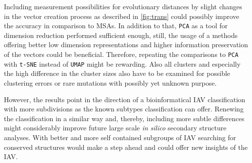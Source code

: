 \vspace{1em}

Including measurement possibilities for evolutionary distances by slight changes in the vector creation process as described in \autoref{fig:trans} could possibly improve the accuracy in comparison to \glspl{MSA}. %
In addition to that, \texttt{PCA} as a tool for dimension reduction performed sufficient enough, still, the usage of a methods offering better low dimension representations and higher information preservation of the vectors could be beneficial. Therefore, repeating the comparisons to \texttt{PCA} with \texttt{t-SNE} instead of \texttt{UMAP} might be rewarding. Also all clusters and especially the high difference in the cluster sizes also have to be examined for possible clustering errors or rare mutations with possibly yet unknown purpose. 

\vspace{1em}

However, the results point in the direction of a bioinformatical \gls{IAV} classification with more subdivisions as the known subtypes classification can offer. Renewing the classification in a similar way and, thereby, including more subtle differences might considerably improve future large scale  \textit{in silico} secondary structure analyses. With better and more self contained subgroups of \gls{IAV} searching for conserved structures would make a step ahead and could offer new insights of the \gls{IAV}.






